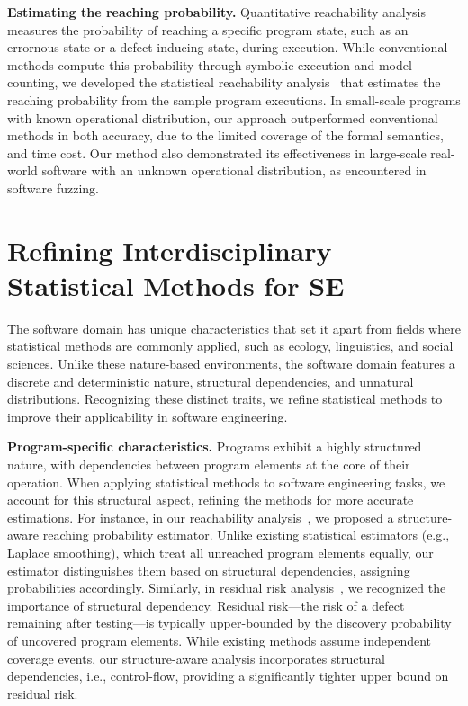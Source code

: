 \documentclass{article}
\begin{document}
\vspace{0.5em}
\noindent\textbf{Estimating the reaching probability.} Quantitative reachability analysis measures the probability of reaching a specific program state, such as an errornous state or a defect-inducing state, during execution. While conventional methods compute this probability through symbolic execution and model counting, we developed the statistical reachability analysis~\cite{leeStatisticalReachabilityAnalysis2023} that estimates the reaching probability from the sample program executions. In small-scale programs with known operational distribution, our approach outperformed conventional methods in both accuracy, due to the limited coverage of the formal semantics, and time cost. Our method also demonstrated its effectiveness in large-scale real-world software with an unknown operational distribution, as encountered in software fuzzing.

\section{Refining Interdisciplinary Statistical Methods for SE}
\label{sec:refine}

The software domain has unique characteristics that set it apart from fields where statistical methods are commonly applied, such as ecology, linguistics, and social sciences. Unlike these nature-based environments, the software domain features a discrete and deterministic nature, structural dependencies, and unnatural distributions. Recognizing these distinct traits, we refine statistical methods to improve their applicability in software engineering.

\vspace{0.5em}
\noindent\textbf{Program-specific characteristics.}
Programs exhibit a highly structured nature, with dependencies between program elements at the core of their operation. When applying statistical methods to software engineering tasks, we account for this structural aspect, refining the methods for more accurate estimations. For instance, in our reachability analysis~\cite{leeStatisticalReachabilityAnalysis2023}, we proposed a structure-aware reaching probability estimator. Unlike existing statistical estimators (e.g., Laplace smoothing), which treat all unreached program elements equally, our estimator distinguishes them based on structural dependencies, assigning probabilities accordingly. Similarly, in residual risk analysis~\cite{leeStructureawareResidualRisk2025}, we recognized the importance of structural dependency. Residual risk—the risk of a defect remaining after testing—is typically upper-bounded by the discovery probability of uncovered program elements. While existing methods assume independent coverage events, our structure-aware analysis incorporates structural dependencies, i.e., control-flow, providing a significantly tighter upper bound on residual risk.
\end{document}
